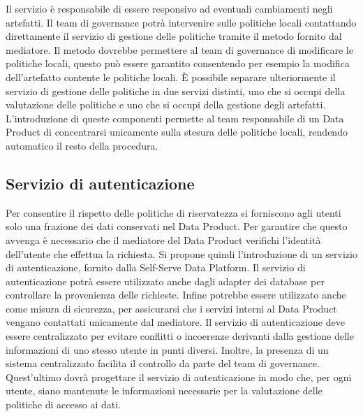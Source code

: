 \documentclass[12pt]{report}
\begin{document}
Il servizio è responsabile di essere responsivo ad eventuali cambiamenti negli artefatti.
Il team di governance potrà intervenire sulle politiche locali contattando direttamente il servizio di gestione delle politiche tramite il metodo fornito dal mediatore. 
Il metodo dovrebbe permettere al team di governance di modificare le politiche locali, questo può essere garantito consentendo per esempio la modifica dell'artefatto contente le politiche locali. 
È possibile separare ulteriormente il servizio di gestione delle politiche in due servizi distinti, uno che si occupi della valutazione delle politiche e uno che si occupi della gestione degli artefatti.
L'introduzione di queste componenti permette al team responsabile di un Data Product di concentrarsi unicamente sulla stesura delle politiche locali, rendendo automatico il resto della procedura.

\subsection{Servizio di autenticazione}
Per consentire il rispetto delle politiche di riservatezza si forniscono agli utenti solo una frazione dei dati conservati nel Data Product.
Per garantire che questo avvenga è necessario che il mediatore del Data Product verifichi l'identità dell'utente che effettua la richiesta.
Si propone quindi l'introduzione di un servizio di autenticazione, fornito dalla Self-Serve Data Platform.
Il servizio di autenticazione potrà essere utilizzato anche dagli adapter dei database per controllare la provenienza delle richieste.
Infine potrebbe essere utilizzato anche come misura di sicurezza, per assicurarsi che i servizi interni al Data Product vengano contattati unicamente dal mediatore.
Il servizio di autenticazione deve essere centralizzato per evitare conflitti o incoerenze derivanti dalla gestione delle informazioni di uno stesso utente in punti diversi.
Inoltre, la presenza di un sistema centralizzato facilita il controllo da parte del team di governance.
Quest'ultimo dovrà progettare il servizio di autenticazione in modo che, per ogni utente, siano mantenute le informazioni necessarie per la valutazione delle politiche di accesso ai dati.
\end{document}
